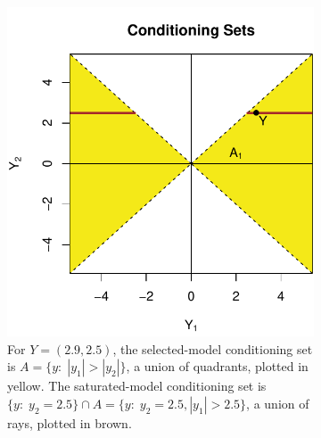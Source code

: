 \documentclass{article}
\begin{document}
\begin{figure}
  \centering
  \begin{subfigure}[t]{.4\textwidth}
    \includegraphics[width=\textwidth]{figs/bivariateSelVSat_condSets.pdf}
    \caption{ 
      For $Y=(2.9,2.5)$, the selected-model conditioning set is
      $A=\{y:\;|y_1|>|y_2|\}$, a union of quadrants,
      plotted in yellow. The saturated-model conditioning set
      is ${\{y:\; y_2=2.5\}\cap A} = {\{y:\;y_2=2.5, |y_1|>2.5\}}$,
      a union of rays, plotted in brown.}
    \label{fig:bv_condSets}
  \end{subfigure}
  \hspace{.1\textwidth}
  \begin{subfigure}[t]{.4\textwidth}

\end{subfigure}
\end{figure}
\end{document}
